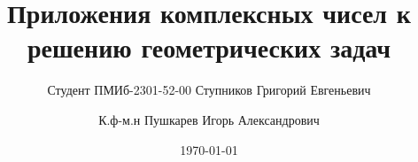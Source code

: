 \documentclass{beamer}
\title[]{Приложения комплексных чисел к решению геометрических задач}
\institute{ФГБОУ ВО «Вятский государственный университет»}
\date{\today}
\author{}
\author[Ступников Г.Е \and к.ф-м.н. Пушкарев И.А.]{Студент ПМИб-2301-52-00 Ступников Григорий Евгеньевич \and К.ф-м.н Пушкарев Игорь Александрович}
\begin{document}
\begin{frame}
    \begin{titlepage}
    \end{titlepage}
\end{frame}
\end{document}
